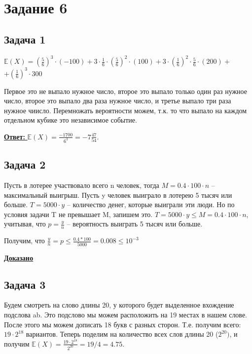 \documentclass[a4paper,14pt]{article} %
\begin{document}

\section{Задание 6}

\subsection{Задача 1}
$
	\mathds{E}(X) = \left( \frac{5}{6} \right)^3 \cdot (-100) 
	+ 3 \cdot \frac{1}{6} \cdot \left(\frac{5}{6} \right)^2 \cdot (100) 
	+ 3 \cdot \left( \frac{1}{6} \right)^2 \cdot \frac{5}{6} \cdot (200) + 
$
\newline
$
	+ \left( \frac{1}{6} \right)^3 \cdot 300
$

Первое это не выпало нужное число, второе это выпало только один раз нужное число, второе это выпало два раза нужное число, и третье выпало три раза нужное чиисло.
Перемножать вероятности можем, т.к. то что выпало на каждом отдельном кубике это независимое событие.

\underline{\textbf{Ответ: }} $\mathds{E}(X) = \frac{-1700}{6^3} = -7\frac{47}{54}$.

\subsection{Задача 2}
Пусть в лотерее участвовало всего n человек, тогда 
\newline $M = 0.4 \cdot 100 \cdot n$ -- максимальный выигрыш.
Пусть y человек выиграло в лотерею 5 тысяч или больше. $T = 5000 \cdot y$ -- количество денег, которые выиграли эти люди.
\newline Но по условия задачи T не превышает M, запишем это. 
\newline $T = 5000 \cdot y \leq M = 0.4 \cdot 100 \cdot n$, учитывая, что $p = \frac{y}{n}$ -- вероятность выиграть 5 тысяч или больше.

Получим, что $\frac{y}{n} = p \leq \frac{0.4 * 100}{5000} = 0.008 \leq 10^{-3}$

\underline{\textbf{Доказано}}

\subsection{Задача 3}
Будем смотреть на слово длины 20, у которого будет выделенное вхождение подслова ab. Это подслово мы можем расположить на 19 местах в нашем слове.
После этого мы можем дописать 18 букв с разных сторон. Т.е. получим всего: $19 \cdot 2^{18}$ вариантов.
\newline
Теперь поделим на количество всех слов длины 20 ($2^{20})$, и получим 
\newline
$\mathds{E}(X) = \frac{19 \cdot 2^{18}}{2^{20}} = 19 / 4 = 4.75$. 
\end{document}

